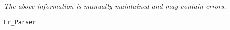 \label{pkg:lr\_parser}

{\tiny \it The above information is manually maintained and may contain errors.}
\begin{verbatim}
Lr_Parser
\end{verbatim}
